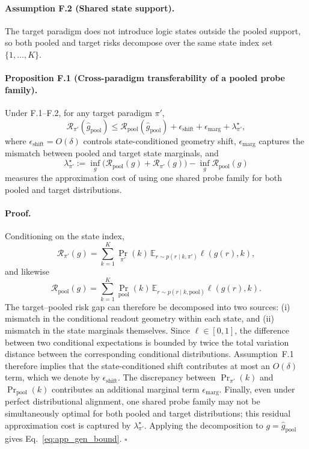 \paragraph{Assumption F.2 (Shared state support).}
The target paradigm does not introduce logic states outside the pooled support, so both pooled and target risks decompose over the same state index set \(\{1,\dots,K\}\).

\paragraph{Proposition F.1 (Cross-paradigm transferability of a pooled probe family).}
Under F.1--F.2, for any target paradigm \(\pi'\),
\begin{equation}
\mathcal{R}_{\pi'}(\hat g_{\mathrm{pool}})
\le
\mathcal{R}_{\mathrm{pool}}(\hat g_{\mathrm{pool}})
+
\epsilon_{\mathrm{shift}}
+
\epsilon_{\mathrm{marg}}
+
\lambda^\star_{\pi'},
\label{eq:app_gen_bound}
\end{equation}
where \(\epsilon_{\mathrm{shift}}=O(\delta)\) controls state-conditioned geometry shift, \(\epsilon_{\mathrm{marg}}\) captures the mismatch between pooled and target state marginals, and
\begin{equation}
\lambda^\star_{\pi'}
:=
\inf_g\bigl(\mathcal{R}_{\mathrm{pool}}(g)+\mathcal{R}_{\pi'}(g)\bigr)
-
\inf_g \mathcal{R}_{\mathrm{pool}}(g)
\label{eq:app_gen_lambda}
\end{equation}
measures the approximation cost of using one shared probe family for both pooled and target distributions.

\paragraph{Proof.}
Conditioning on the state index,
\[
\mathcal{R}_{\pi'}(g)
=
\sum_{k=1}^{K}\Pr_{\pi'}(k)\,
\mathbb{E}_{r\sim p(r\mid k,\pi')}\ell(g(r),k),
\]
and likewise
\[
\mathcal{R}_{\mathrm{pool}}(g)
=
\sum_{k=1}^{K}\Pr_{\mathrm{pool}}(k)\,
\mathbb{E}_{r\sim p(r\mid k,\mathrm{pool})}\ell(g(r),k).
\]
The target--pooled risk gap can therefore be decomposed into two sources: (i) mismatch in the conditional readout geometry within each state, and (ii) mismatch in the state marginals themselves. Since \(\ell\in[0,1]\), the difference between two conditional expectations is bounded by twice the total variation distance between the corresponding conditional distributions. Assumption~F.1 therefore implies that the state-conditioned shift contributes at most an \(O(\delta)\) term, which we denote by \(\epsilon_{\mathrm{shift}}\). The discrepancy between \(\Pr_{\pi'}(k)\) and \(\Pr_{\mathrm{pool}}(k)\) contributes an additional marginal term \(\epsilon_{\mathrm{marg}}\). Finally, even under perfect distributional alignment, one shared probe family may not be simultaneously optimal for both pooled and target distributions; this residual approximation cost is captured by \(\lambda^\star_{\pi'}\). Applying the decomposition to \(g=\hat g_{\mathrm{pool}}\) gives Eq.~\eqref{eq:app_gen_bound}. \(\square\)

